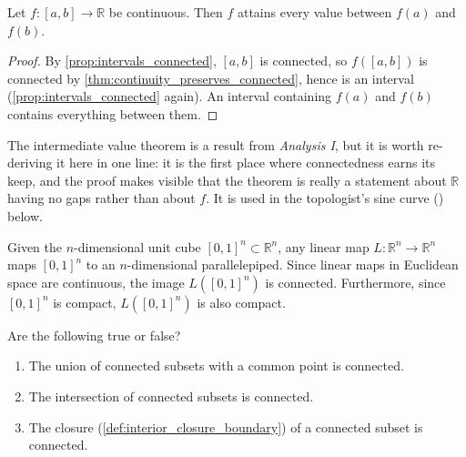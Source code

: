 \begin{corollary}
\label{cor:intermediate_value_theorem}
Let $f : [a,b] \to \mathbb{R}$ be continuous. Then $f$ attains every value between $f(a)$ and
$f(b)$.
\end{corollary}

\begin{proof}
By \cref{prop:intervals_connected}, $[a,b]$ is connected, so $f([a,b])$ is connected by
\cref{thm:continuity_preserves_connected}, hence is an interval (\cref{prop:intervals_connected}
again). An interval containing $f(a)$ and $f(b)$ contains everything between them.
\end{proof}

\begin{ainote}
The intermediate value theorem is a result from \emph{Analysis I}, but it is worth re-deriving
it here in one line: it is the first place where connectedness earns its keep, and the proof
makes visible that the theorem is really a statement about $\mathbb{R}$ having no gaps rather
than about $f$. It is used in the topologist's sine curve
() below.
\end{ainote}

\begin{corollary}
\label{cor:linear_maps_unit_cube}
Given the $n$-dimensional unit cube $[0,1]^n \subset \mathbb{R}^n$, any linear map $L : \mathbb{R}^n \to \mathbb{R}^n$ maps $[0,1]^n$ to an $n$-dimensional parallelepiped. Since linear maps in Euclidean space are continuous, the image $L([0,1]^n)$ is connected. Furthermore, since $[0,1]^n$ is compact, $L([0,1]^n)$ is also compact.
\end{corollary}

\begin{exercise}
\label{ex:connectedness_tf}
Are the following true or false?
\begin{enumerate}[label=\textbf{(\alph*)}]
  \item The union of connected subsets with a common point is connected.
  \item The intersection of connected subsets is connected.
  \item The closure (\cref{def:interior_closure_boundary}) of a connected subset is connected.
\end{enumerate}
\end{exercise}

